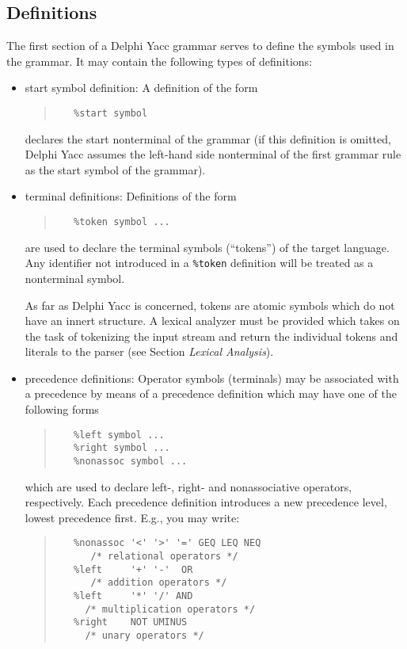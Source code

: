 \documentclass[a4paper]{article}
\begin{document}
\subsection{Definitions}

The first section of a Delphi Yacc grammar serves to define the symbols used in
the grammar. It may contain the following types of definitions:

\begin{itemize}
   \item
      start symbol definition: A definition of the form
      \begin{quote}\begin{verbatim}
   %start symbol
      \end{verbatim}\end{quote}
      declares the start nonterminal of the grammar (if this definition is
      omitted, Delphi Yacc assumes the left-hand side nonterminal of the first
      grammar rule as the start symbol of the grammar).
   \item
      terminal definitions: Definitions of the form
      \begin{quote}\begin{verbatim}
   %token symbol ...
      \end{verbatim}\end{quote}
      are used to declare the terminal symbols (``tokens'') of the target
      language. Any identifier not introduced in a \verb"%token" definition
      will be treated as a nonterminal symbol.
    
      As far as Delphi Yacc is concerned, tokens are atomic symbols which do not
      have an innert structure. A lexical analyzer must be provided which
      takes on the task of tokenizing the input stream and return the
      individual tokens and literals to the parser (see Section {\em Lexical
      Analysis\/}).
   \item
      precedence definitions: Operator symbols (terminals) may be associated
      with a precedence by means of a precedence definition which may have
      one of the following forms
      \begin{quote}\begin{verbatim}
   %left symbol ...
   %right symbol ...
   %nonassoc symbol ...
      \end{verbatim}\end{quote}
      which are used to declare left-, right- and nonassociative operators,
      respectively. Each precedence definition introduces a new precedence
      level, lowest precedence first. E.g., you may write:
      \begin{quote}\begin{verbatim}
   %nonassoc '<' '>' '=' GEQ LEQ NEQ
      /* relational operators */
   %left     '+' '-'  OR
      /* addition operators */
   %left     '*' '/' AND
     /* multiplication operators */
   %right    NOT UMINUS
     /* unary operators */
      \end{verbatim}\end{quote}


\end{itemize}
\end{document}
